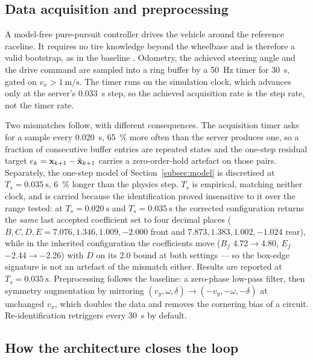 \subsection{Data acquisition and preprocessing}
\label{subsec:data}

A model-free pure-pursuit controller drives the vehicle around the reference
raceline. It requires no tire knowledge beyond the wheelbase and is therefore
a valid bootstrap, as in the baseline \cite{ontrack2025,forzaeth2024}.
Odometry, the achieved steering angle and the drive command are sampled into a
ring buffer by a \SI{50}{\hertz} timer for \SI{30}{\second}, gated on
$v_{x}>\SI{1}{\meter\per\second}$. The timer runs on the simulation clock,
which advances only at the server's \SI{0.033}{\second} step, so the achieved
acquisition rate is the step rate, not the timer rate.

Two mismatches follow, with different consequences. The acquisition timer asks
for a sample every \SI{0.020}{\second}, \SI{65}{\percent} more often than the
server produces one, so a fraction of consecutive buffer entries are repeated
states and the one-step residual target $e_{k}=\mathbf{x}_{k+1}-\hat{\mathbf{x}}_{k+1}$
carries a zero-order-hold artefact on those pairs. Separately, the one-step
model of Section~\ref{subsec:model} is discretised at
$T_{s}=\SI{0.035}{\second}$, \SI{6}{\percent} longer than the physics step.
$T_{s}$ is empirical, matching neither clock, and is carried because the
identification proved insensitive to it over the range tested: at
$T_{s}=\SI{0.020}{\second}$ and $T_{s}=\SI{0.035}{\second}$ the corrected
configuration returns the \emph{same} last accepted coefficient set to four
decimal places ($B,C,D,E=\num{7.076},\num{1.346},\num{1.009},\num{-2.000}$
front and $\num{7.873},\num{1.383},\num{1.002},\num{-1.024}$ rear), while in
the inherited configuration the coefficients move ($B_{f}$
\num{4.72}$\rightarrow$\num{4.80}, $E_{f}$ \num{-2.44}$\rightarrow$\num{-2.26})
with $D$ on its \num{2.0} bound at both settings --- so the box-edge signature
is not an artefact of the mismatch either. Results are reported at
$T_{s}=\SI{0.035}{\second}$. Preprocessing follows the baseline: a zero-phase
low-pass filter, then symmetry augmentation by mirroring
$(v_{y},\omega,\delta)\rightarrow(-v_{y},-\omega,-\delta)$ at unchanged
$v_{x}$, which doubles the data and removes the cornering bias of a circuit.
Re-identification retriggers every \SI{30}{\second} by default.

\subsection{How the architecture closes the loop}

